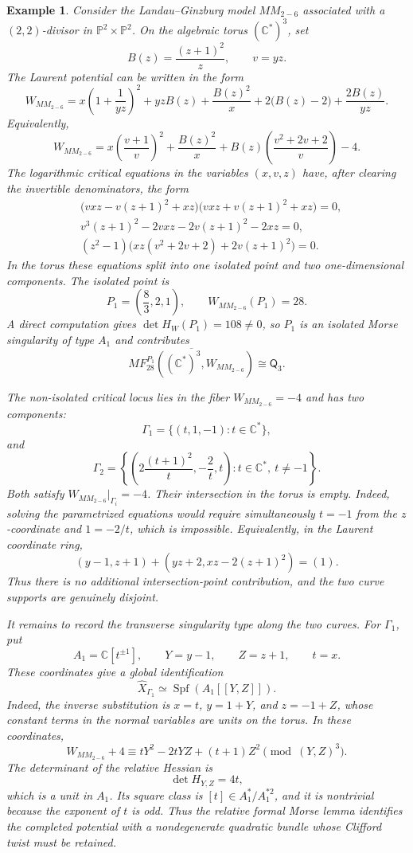 \documentclass[11pt]{amsart}
\newtheorem{example}{Example}[section]
\newcommand{\MorseCat}[1]{\mathsf{Q}_{#1}}
\begin{document}
\begin{example}
Consider the Landau--Ginzburg model $MM_{2-6}$ associated with a
$(2,2)$-divisor in $\mathbb{P}^2\times\mathbb{P}^2$. On the algebraic torus
$(\mathbb{C}^*)^3$, set
\[
B(z)=\frac{(z+1)^2}{z},\qquad v=yz.
\]
The Laurent potential can be written in the form
\[
W_{MM_{2-6}}
=x\left(1+\frac{1}{yz}\right)^2+yzB(z)+\frac{B(z)^2}{x}
+2\bigl(B(z)-2\bigr)+\frac{2B(z)}{yz}.
\]
Equivalently,
\[
W_{MM_{2-6}}
=x\left(\frac{v+1}{v}\right)^2+
\frac{B(z)^2}{x}+B(z)\left(\frac{v^2+2v+2}{v}\right)-4.
\]
The logarithmic critical equations in the variables $(x,v,z)$ have, after
clearing the invertible denominators, the form
\begin{align*}
&\bigl(vxz-v(z+1)^2+xz\bigr)\bigl(vxz+v(z+1)^2+xz\bigr)=0,\\
&v^3(z+1)^2-2vxz-2v(z+1)^2-2xz=0,\\
&(z^2-1)\bigl(xz(v^2+2v+2)+2v(z+1)^2\bigr)=0.
\end{align*}
In the torus these equations split into one isolated point and two
one-dimensional components. The isolated point is
\[
P_1=\left(\frac{8}{3},2,1\right),
\qquad
W_{MM_{2-6}}(P_1)=28.
\]
A direct computation gives $\det H_W(P_1)=108\neq0$, so $P_1$ is an isolated
Morse singularity of type $A_1$ and contributes
\[
\overline{MF^{P_1}_{28}((\mathbb{C}^*)^3,W_{MM_{2-6}})}
\cong \MorseCat{3}.
\]

The non-isolated critical locus lies in the fiber $W_{MM_{2-6}}=-4$ and has two
components:
\[
\Gamma_1=\{(t,1,-1):t\in\mathbb{C}^*\},
\]
and
\[
\Gamma_2=\left\{\left(2\frac{(t+1)^2}{t},-\frac{2}{t},t\right):
t\in\mathbb{C}^*,\ t\neq -1\right\}.
\]
Both satisfy $W_{MM_{2-6}}|_{\Gamma_i}=-4$. Their intersection in the torus is
empty. Indeed, solving the parametrized equations would require simultaneously
$t=-1$ from the $z$-coordinate and $1=-2/t$, which is impossible. Equivalently,
in the Laurent coordinate ring,
\[
(y-1,z+1)+(yz+2,xz-2(z+1)^2)=(1).
\]
Thus there is no additional intersection-point contribution, and the two
curve supports are genuinely disjoint.

It remains to record the transverse singularity type along the two curves. For
$\Gamma_1$, put
\[
A_1=\mathbb C[t^{\pm1}],
\qquad
Y=y-1,
\qquad
Z=z+1,
\qquad
t=x.
\]
These coordinates give a global identification
\[
\widehat X_{\Gamma_1}\simeq\operatorname{Spf}(A_1[[Y,Z]]).
\]
Indeed, the inverse substitution is $x=t$, $y=1+Y$, and $z=-1+Z$, whose
constant terms in the normal variables are units on the torus. In these
coordinates,
\[
W_{MM_{2-6}}+4\equiv tY^2-2tYZ+(t+1)Z^2
\pmod{(Y,Z)^3}.
\]
The determinant of the relative Hessian is
\[
\det H_{Y,Z}=4t,
\]
which is a unit in $A_1$. Its square class is $[t]\in
A_1^*/A_1^{*2}$, and it is nontrivial because the exponent of $t$ is odd.
Thus the relative formal Morse lemma identifies the completed potential with
a nondegenerate quadratic bundle whose Clifford twist must be retained.


\end{example}
\end{document}
